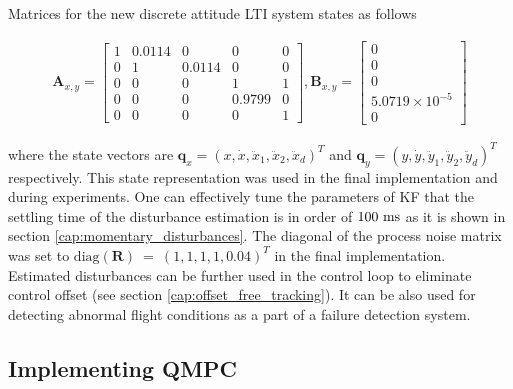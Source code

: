 Matrices for the new discrete attitude LTI system states as follows	

\begin{equation}
\begin{split}
\mathbf{A}_{x, y} = \begin{bmatrix}
1 & 0.0114 & 0 & 0 & 0 \\
0 & 1 & 0.0114 & 0 & 0\\
0 & 0 & 0 & 1 & 1 \\
0 & 0 & 0 & 0.9799 & 0 \\
0 & 0 & 0 & 0 & 1
\end{bmatrix}, \mathbf{B}_{x, y} = \begin{bmatrix}
0\\
0\\
0\\
5.0719 \times 10^{-5}\\
0
\end{bmatrix}
\end{split}
\label{eq:attitude_LTI_big_identified}
\end{equation}

where the state vectors are $\mathbf{q}_{x} = \left(x, \dot{x}, \ddot{x}_1, \ddot{x}_2, \ddot{x}_d\right)^T$ and $\mathbf{q}_{y} = \left(y, \dot{y}, \ddot{y}_1, \ddot{y}_2, \ddot{y}_d\right)^T$ respectively. This state representation was used in the final implementation and during experiments. One can effectively tune the parameters of KF that the settling time of the disturbance estimation is in order of $100~\mathrm{ms}$ as it is shown in section \ref{cap:momentary_disturbances}. The diagonal of the process noise matrix was set to $\mathrm{diag}(\textbf{R})~=~\left(1, 1, 1, 1, 0.04\right)^T$ in the final implementation. Estimated disturbances can be further used in the control loop to eliminate control offset (see section \ref{cap:offset_free_tracking}). It can be also used for detecting abnormal flight conditions as a part of a failure detection system.
 
\subsection{Implementing QMPC}

